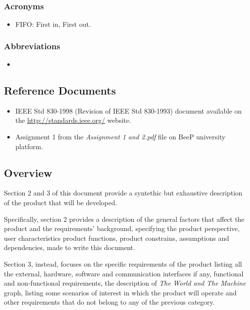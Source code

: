 		\subsubsection{Acronyms}
		\begin{itemize}
			\item FIFO: First in, First out.
		\end{itemize}
		\subsubsection{Abbreviations}
		\begin{itemize}
			\item 
		\end{itemize}
	\subsection{Reference Documents}
	\begin{itemize}
		\item IEEE Std 830-1998 (Revision of IEEE Std 830-1993) document available on the \url{http://standards.ieee.org/} website.
		\item Assignment 1 from the \emph{Assignment 1 and 2.pdf} file on BeeP university platform.
	\end{itemize}
	\subsection{Overview}
		Section 2 and 3 of this document provide a syntethic but exhaustive description of the product that will be developed.
				
		Specifically, section 2 provides a description of the general factors that affect the product and the requirements' background, specifying the product perspective, user characteristics product functions, product constrains, assumptions and dependencies, made to write this document.
		
		Section 3, instead, focuses on the specific requirements of the product listing all the external, hardware, software and communication interfaces if any, functional and non-functional requirements, the description of \emph{The World and The Machine} graph, listing some scenarios of interest in which the product will operate and other requirements that do not belong to any of the previous category. 
	
	